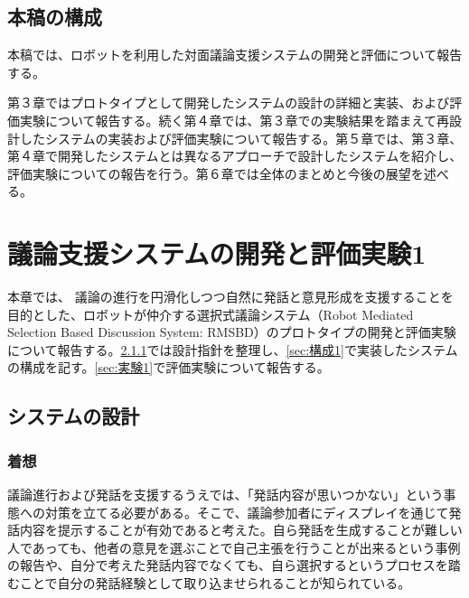 \documentclass[11pt, a4paper]{jreport} %
\begin{document}

\section{本稿の構成}
本稿では、ロボットを利用した対面議論支援システムの開発と評価について報告する。%

第３章ではプロトタイプとして開発したシステムの設計の詳細と実装、および評価実験について報告する。続く第４章では、第３章での実験結果を踏まえて再設計したシステムの実装および評価実験について報告する。第５章では、第３章、第４章で開発したシステムとは異なるアプローチで設計したシステムを紹介し、評価実験についての報告を行う。第６章では全体のまとめと今後の展望を述べる。




\chapter{議論支援システムの開発と評価実験1}

本章では、%
議論の進行を円滑化しつつ自然に発話と意見形成を支援することを目的とした、ロボットが仲介する選択式議論システム（Robot Mediated Selection Based Discussion System: RMSBD）のプロトタイプの開発と評価実験について報告する。\ref{sec:要件1}では設計指針を整理し、\ref{sec:構成1}で実装したシステムの構成を記す。\ref{sec:実験1}で評価実験について報告する。




\section{システムの設計}
\subsection{着想}
\label{sec:要件1}
%

議論進行および発話を支援するうえでは、「発話内容が思いつかない」という事態への対策を立てる必要がある。そこで、議論参加者にディスプレイを通じて発話内容を提示することが有効であると考えた。自ら発話を生成することが難しい人であっても、他者の意見を選ぶことで自己主張を行うことが出来るという事例の報告\cite{岡耕平2014}や、自分で考えた発話内容でなくても、自ら選択するというプロセスを踏むことで自分の発話経験として取り込ませられること\cite{渡辺美紀2017}が知られている。
\end{document}
